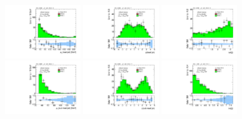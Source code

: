 \clearpage

\begin{figure}[!htpb]
  \includegraphics[width=0.30\textwidth]{figures/analysis/vbf-ZllCR/jet-1-pt}
  \includegraphics[width=0.30\textwidth]{figures/analysis/vbf-ZllCR/jet-1-eta}
  \includegraphics[width=0.30\textwidth]{figures/analysis/vbf-ZllCR/jets-dphi} \\
  \includegraphics[width=0.30\textwidth]{figures/analysis/vbf-ZllCR/jet-2-pt}
  \includegraphics[width=0.30\textwidth]{figures/analysis/vbf-ZllCR/jet-2-eta}
  \includegraphics[width=0.30\textwidth]{figures/analysis/vbf-ZllCR/jets-deta} \\

\end{figure}

